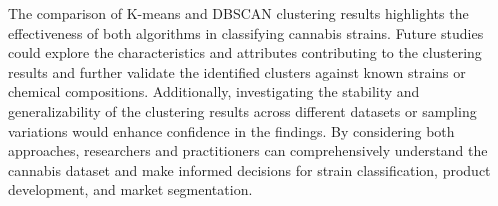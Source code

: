 \documentclass[11pt,a4paper]{article}
\newcommand{\noi}{\noindent}
\begin{document}
\noi
The comparison of K-means and DBSCAN clustering results highlights the effectiveness of both algorithms in classifying cannabis strains. Future studies could explore the characteristics and attributes contributing to the clustering results and further validate the identified clusters against known strains or chemical compositions. Additionally, investigating the stability and generalizability of the clustering results across different datasets or sampling variations would enhance confidence in the findings. By considering both approaches, researchers and practitioners can comprehensively understand the cannabis dataset and make informed decisions for strain classification, product development, and market segmentation.




\end{document}
